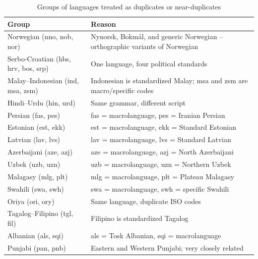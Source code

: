 \begin{table}[p]
\centering
\footnotesize
\caption{Groups of languages treated as duplicates or near-duplicates}
\label{tab:duplicate_languages}
\begin{tabularx}{\textwidth}{
>{\hsize=0.6\hsize\raggedright\arraybackslash}X|
>{\hsize=1.4\hsize\raggedright\arraybackslash}X
}
\textbf{Group} & \textbf{Reason} \\
\hline
\hline
Norwegian (nno, nob, nor) & Nynorsk, Bokmål, and generic Norwegian -- orthographic variants of Norwegian \\
\hline
Serbo-Croatian (hbs, hrv, bos, srp) & One language, four political standards \\
\hline
Malay--Indonesian (ind, msa, zsm) & Indonesian is standardized Malay; msa and zsm are macro/specific codes \\
\hline
Hindi--Urdu (hin, urd) & Same grammar, different script \\
\hline
Persian (fas, pes) & fas = macrolanguage, pes = Iranian Persian \\
\hline
Estonian (est, ekk) & est = macrolanguage, ekk = Standard Estonian \\
\hline
Latvian (lav, lvs) & lav = macrolanguage, lvs = Standard Latvian \\
\hline
Azerbaijani (aze, azj) & aze = macrolanguage, azj = North Azerbaijani \\
\hline
Uzbek (uzb, uzn) & uzb = macrolanguage, uzn = Northern Uzbek \\
\hline
Malagasy (mlg, plt) & mlg = macrolanguage, plt = Plateau Malagasy \\
\hline
Swahili (swa, swh) & swa = macrolanguage, swh = specific Swahili \\
\hline
Oriya (ori, ory) & Same language, duplicate ISO codes \\
\hline
Tagalog--Filipino (tgl, fil) & Filipino is standardized Tagalog \\
\hline
Albanian (als, sqi) & als = Tosk Albanian, sqi = macrolanguage \\
\hline
Punjabi (pan, pnb) & Eastern and Western Punjabi; very closely related \\
\hline
\end{tabularx}

 \vspace{1em}
\end{table}
